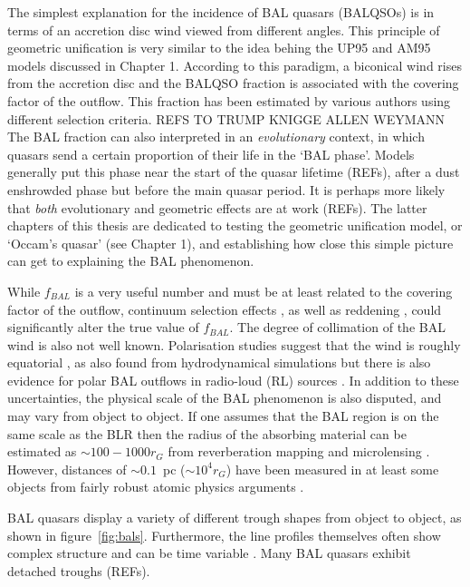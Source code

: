The simplest explanation for the incidence of 
BAL quasars (BALQSOs) is in terms of an accretion disc wind viewed
from different angles. This principle of geometric unification
is very similar to the idea behing the UP95 and AM95 models discussed in Chapter 1.
According to this paradigm, a biconical wind rises from 
the accretion disc and the BALQSO fraction is associated with
the covering factor of the outflow. This fraction
has been estimated by various authors using different selection criteria.
REFS TO TRUMP KNIGGE ALLEN WEYMANN
The BAL fraction can also interpreted in an {\em evolutionary}
context, in which quasars send a certain proportion of their life
in the `BAL phase'. Models generally put this phase near the start
of the quasar lifetime (REFs), after a dust enshrowded phase but before
the main quasar period. It is perhaps more likely that {\em both} 
evolutionary and geometric effects are at work (REFs). 
The latter chapters of this thesis are dedicated
to testing the geometric unification model, or `Occam's quasar' (see Chapter 1),
and establishing how close this simple picture can get to explaining 
the BAL phenomenon.  

While $f_{BAL}$ is a very useful number and must be at least
related to the covering factor of the outflow, continuum selection
effects \citep{goodrich1997,krolikvoit1998}, 
as well as reddening \citep{allen2011}, could significantly
alter the true value of $f_{BAL}$. The degree of collimation of the BAL wind
is also not well known. Polarisation studies suggest that the 
wind is roughly equatorial \citep{goodrich1995, cohen1995}, 
as also found from hydrodynamical simulations  
but there is also evidence for polar BAL outflows in 
radio-loud (RL) sources \citep{zhou2006,ghoshpunsly2007}.
In addition to these uncertainties, the physical scale of the BAL
phenomenon is also disputed, and may vary from object to object.
If one assumes that the BAL region is on the same scale as 
the BLR then the radius of the absorbing material
can be estimated as $\sim 100-1000 r_G$ from reverberation mapping
and microlensing \citep[e.g., for BLRs in BALQSOs,][]{sluse2015,odowd2015}.
However, distances of  $\sim0.1$~pc ($\sim 10^4 r_G$) have been measured in at least 
some objects from fairly robust atomic physics arguments 
\citep{borguet2014,chamberlain2015}.

BAL quasars display a variety of different trough shapes from object 
to object, as shown in figure~\ref{fig:bals}. Furthermore, the 
line profiles themselves often show complex structure 
\citep{ganguly2006, simonhamann2010} and can be time variable 
\citep{capellupo2011,capellupo2012,capellupo2014}. 
Many BAL quasars exhibit detached troughs (REFs).

